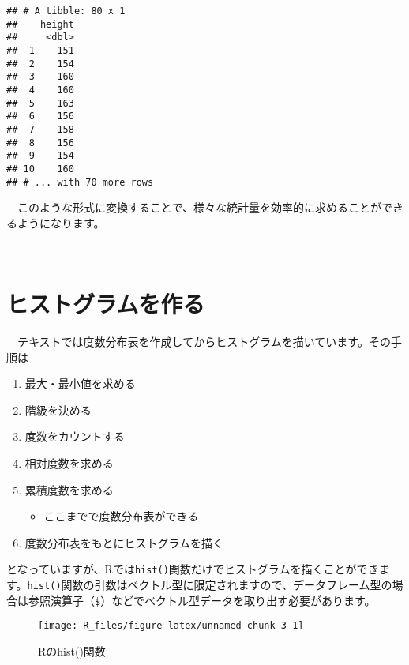 \documentclass[
  12pt,
]{book}
\newenvironment{Shaded}{\begin{snugshade}}{\end{snugshade}}
\newcommand{\AttributeTok}[1]{\textcolor[rgb]{0.77,0.63,0.00}{#1}}
\newcommand{\FunctionTok}[1]{\textcolor[rgb]{0.00,0.00,0.00}{#1}}
\newcommand{\NormalTok}[1]{#1}
\newcommand{\SpecialCharTok}[1]{\textcolor[rgb]{0.00,0.00,0.00}{#1}}
\providecommand{\tightlist}{%
  \setlength{\itemsep}{0pt}\setlength{\parskip}{0pt}}
\begin{document}
\begin{verbatim}
## # A tibble: 80 x 1
##    height
##     <dbl>
##  1    151
##  2    154
##  3    160
##  4    160
##  5    163
##  6    156
##  7    158
##  8    156
##  9    154
## 10    160
## # ... with 70 more rows
\end{verbatim}

　このような形式に変換することで、様々な統計量を効率的に求めることができるようになります。

　

\hypertarget{ux30d2ux30b9ux30c8ux30b0ux30e9ux30e0ux3092ux4f5cux308b}{%
\section{ヒストグラムを作る}\label{ux30d2ux30b9ux30c8ux30b0ux30e9ux30e0ux3092ux4f5cux308b}}

　テキストでは度数分布表を作成してからヒストグラムを描いています。その手順は

\begin{enumerate}
\def\labelenumi{\arabic{enumi}.}
\tightlist
\item
  最大・最小値を求める
\item
  階級を決める
\item
  度数をカウントする
\item
  相対度数を求める
\item
  累積度数を求める

  \begin{itemize}
  \tightlist
  \item
    ここまでで度数分布表ができる
  \end{itemize}
\item
  度数分布表をもとにヒストグラムを描く
\end{enumerate}

となっていますが、Rでは\texttt{hist()}関数だけでヒストグラムを描くことができます。\texttt{hist()}関数の引数はベクトル型に限定されますので、データフレーム型の場合は参照演算子（\texttt{\$}）などでベクトル型データを取り出す必要があります。

\begin{Shaded}
\end{Shaded}

\begin{figure}[H]

{\centering \texttt{[image: R\_files/figure-latex/unnamed-chunk-3-1]} 

}

\caption{Rのhist()関数}\label{fig:unnamed-chunk-3}
\end{figure}
\end{document}
